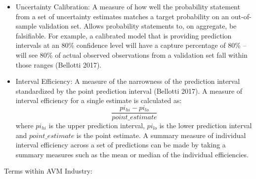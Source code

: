 \documentclass[colTwo]{anon}
\theoremstyle{definition}
\begin{document}
\begin{itemize}
\item Uncertainty Calibration: A measure of how well the probability statement from a set of uncertainty estimates matches a target probability on an out-of-sample validation set. Allows probability statements to, on aggregate, be falsifiable. For example, a calibrated model that is providing prediction intervals at an 80\% confidence level will have a capture percentage of 80\% -- will see 80\% of actual observed observations from a validation set fall within those ranges (Bellotti 2017).
\item Interval Efficiency: A measure of the narrowness of the prediction interval standardized by the point prediction interval (Bellotti 2017). A measure of interval efficiency for a single estimate is calculated as: 
\[\frac{pi_{hi} - pi_{lo}}{point\_estimate}\] where \(pi_{hi}\) is the upper prediction interval, \(pi_{lo}\) is the lower prediction interval and \(point\_estimate\) is the point estimate. A summary measure of individual interval efficiency across a set of predictions can be made by taking a summary measures such as the mean or median of the individual efficiencies.

\end{itemize}

Terms within AVM Industry:
\end{document}
